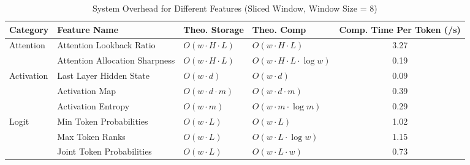 \begin{table*}[ht]
\centering

\begin{tabular}{|l|l|l|l|c|}
\hline\hline
\textbf{Category} & \textbf{Feature Name}       & \textbf{Theo. Storage} & \textbf{Theo. Comp} & \textbf{Comp. Time Per Token (/s)} \\ \hline\hline
\multirow{2}{*}{Attention} 
                  & Attention Lookback Ratio    & $O(w \cdot H \cdot L)$               & $O(w \cdot H \cdot L)$                   & 3.27                                \\ \cline{2-5}
                  & Attention Allocation Sharpness & $O(w \cdot H \cdot L)$            & $O(w \cdot H \cdot L \cdot \log w)$      & 0.19                                \\ \hline\hline
\multirow{3}{*}{Activation}
                  & Last Layer Hidden State     & $O(w \cdot d)$                       & $O(w \cdot d)$                           & 0.09                                \\ \cline{2-5}
                  & Activation Map              & $O(w \cdot d \cdot m)$               & $O(w \cdot d \cdot m)$                   & 0.39                                \\ \cline{2-5}
                  & Activation Entropy          & $O(w \cdot m)$                       & $O(w \cdot m \cdot \log m)$              & 0.29                                \\ \hline\hline
\multirow{3}{*}{Logit}
                  & Min Token Probabilities     & $O(w \cdot L)$                       & $O(w \cdot L)$                           & 1.02                                \\ \cline{2-5}
                  & Max Token Ranks             & $O(w \cdot L)$                       & $O(w \cdot L \cdot \log w)$              & 1.15                               \\ \cline{2-5}
                  & Joint Token Probabilities   & $O(w \cdot L)$                       & $O(w \cdot L \cdot w)$                   & 0.73                                \\ \hline\hline
\end{tabular}
\caption{System Overhead for Different Features (Sliced Window, Window Size = 8)}
\label{tab:system_overhead}
\end{table*}

